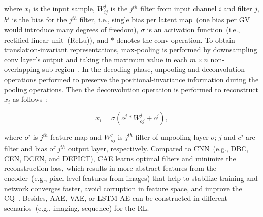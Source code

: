 where $x_i$ is the input sample, $W_{ij}^{j}$ is the $j^{th}$ filter from input channel $i$ and filter $j$, $b^j$ is the bias for the $j^{th}$ filter, i.e., single bias per latent map~(one bias per GV would introduce many degrees of freedom), $\sigma$ is an activation function~(i.e., rectified linear unit~(ReLu)), and $*$ denotes the conv operation. To obtain translation-invariant representations, max-pooling is performed by downsampling conv layer's output and taking the maximum value in each $m \times n$ non-overlapping sub-region~\cite{alirezaie2019semantic}. In the decoding phase, unpooling and deconvolution operations performed to preserve the positional-invariance information during the pooling operations. Then the deconvolution operation is performed to reconstruct $x_i$ as follows~\cite{alirezaie2019semantic}:

\begin{equation}
   x_i = \sigma\left(o^{j} * W_{oj}^{j}+c^{j}\right),
\end{equation}

where $o^j$ is $j^{th}$ feature map and $W_{oj}^{j}$ is $j^{th}$ filter of unpooling layer $o$; $j$ and $c^j$ are filter and bias of $j^{th}$ output layer, respectively. Compared to CNN~(e.g., DBC, CEN, DCEN, and DEPICT), CAE learns optimal filters and minimize the reconstruction loss, which results in more abstract features from the encoder~(e.g., pixel-level features from images) that help to stabilize training and network converges faster, avoid corruption in feature space, and improve the CQ~\cite{guo2017deep}. Besides, AAE, VAE, or LSTM-AE can be constructed in different scenarios~(e.g., imaging, sequence) for the RL. 

